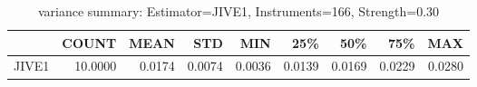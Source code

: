 \begin{table}[ht]
\centering
\caption{variance summary: Estimator=JIVE1, Instruments=166, Strength=0.30}
\begin{tabular}{lrrrrrrrr}
\toprule
 & COUNT & MEAN & STD & MIN & 25\% & 50\% & 75\% & MAX \\
\midrule
JIVE1 & 10.0000 & 0.0174 & 0.0074 & 0.0036 & 0.0139 & 0.0169 & 0.0229 & 0.0280 \\
\bottomrule
\end{tabular}
\end{table}
